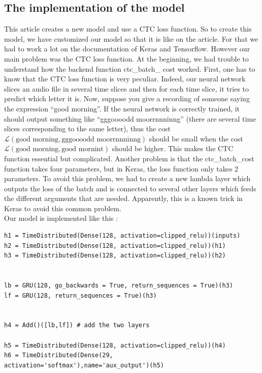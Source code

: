 \documentclass[12pt]{article}
\begin{document}
\subsection{The implementation of the model}

This article \cite{article} creates a new model and use a CTC loss function. So to create this model, we have customized our model so that it is like on the article. For that we had to work a lot on the documentation of Keras and Tensorflow. However our main problem was the CTC loss function. At the beginning, we had trouble to understand how the backend function ctc\_batch\_ cost worked. First, one has to know that the CTC loss function is very peculiar. Indeed, our neural network slices an audio file in several time slices and then for each time slice, it tries to predict which letter it is. Now, suppose you give a recording of someone saying the expression ``good morning''. If the neural network is correctly trained, it should output something like ``gggoooodd moorrnnninng'' (there are several time slices corresponding to the same letter), thus the cost $\mathcal{L}(\mbox{good morning}, \mbox{gggoooodd moorrnnninng})$ should be small when the cost $\mathcal{L}(\mbox{good morning}, \mbox{good mornint})$ should be higher. This makes the CTC function essential but complicated. Another problem is that the ctc\_batch\_cost function takes four parameters, but in Keras, the loss function only takes 2 parameters. To avoid this problem, we had to create a new lambda layer which outputs the loss of the batch and is connected to several other layers which feeds the different arguments that are needed. Apparently, this is a known trick in Keras to avoid this common problem. \\

Our model is implemented like this :

\begin{lstlisting}
h1 = TimeDistributed(Dense(128, activation=clipped_relu))(inputs)
h2 = TimeDistributed(Dense(128, activation=clipped_relu))(h1)
h3 = TimeDistributed(Dense(128, activation=clipped_relu))(h2)


lb = GRU(128, go_backwards = True, return_sequences = True)(h3)
lf = GRU(128, return_sequences = True)(h3)


h4 = Add()([lb,lf]) # add the two layers

h5 = TimeDistributed(Dense(128, activation=clipped_relu))(h4)
h6 = TimeDistributed(Dense(29, activation='softmax'),name='aux_output')(h5)
\end{lstlisting}
\end{document}
